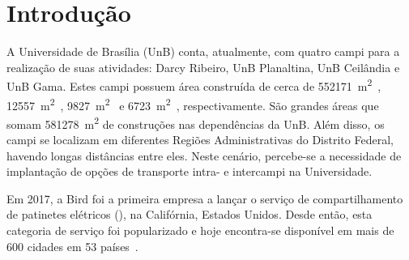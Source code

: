 \chapter[Introdução]{Introdução}

A Universidade de Brasília (UnB) conta, atualmente, com quatro campi para a realização de suas atividades: Darcy Ribeiro, UnB Planaltina, UnB Ceilândia e UnB Gama. Estes campi possuem área construída de cerca de \SI{552 171}{\meter\squared}~\cite{ceplan2017Darcy}, \SI{12 557}{\meter\squared}~\cite{ceplan2017FUP}, \SI{9 827}{\meter\squared}~\cite{ceplan2017FCE} e \SI{6 723}{\meter\squared}~\cite{ceplan2017FGA}, respectivamente. São grandes áreas que somam \SI{581 278}{\meter\squared} de construções nas dependências da UnB. Além disso, os campi se localizam em diferentes Regiões Administrativas do Distrito Federal, havendo longas distâncias entre eles. Neste cenário, percebe-se a necessidade de implantação de opções de transporte intra- e intercampi na Universidade.

Em 2017, a  Bird foi a primeira empresa a lançar o serviço de compartilhamento de patinetes elétricos (), na Califórnia, Estados Unidos. Desde então, esta categoria de serviço foi popularizado e hoje encontra-se disponível em mais de 600 cidades em 53 países~\cite{moller2020}.

